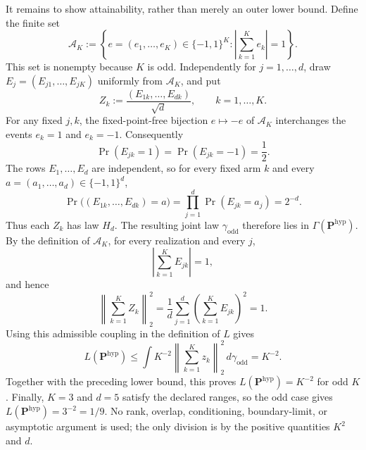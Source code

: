 It remains to show attainability, rather than merely an outer lower bound.  Define the finite set
\[
 \mathcal A_K
 :=\left\{e=(e_1,\ldots,e_K)\in\{-1,1\}^K:
 \left|\sum_{k=1}^K e_k\right|=1\right\}.
\]
This set is nonempty because \(K\) is odd.  Independently for \(j=1,\ldots,d\), draw \(E_j=(E_{j1},\ldots,E_{jK})\) uniformly from \(\mathcal A_K\), and put
\[
 Z_k:=\frac{(E_{1k},\ldots,E_{dk})}{\sqrt d},
 \qquad k=1,\ldots,K.
\]
For any fixed \(j,k\), the fixed-point-free bijection \(e\mapsto-e\) of \(\mathcal A_K\) interchanges the events \(e_k=1\) and \(e_k=-1\).  Consequently
\[
 \Pr(E_{jk}=1)=\Pr(E_{jk}=-1)=\frac12.
\]
The rows \(E_1,\ldots,E_d\) are independent, so for every fixed arm \(k\) and every \(a=(a_1,\ldots,a_d)\in\{-1,1\}^d\),
\[
 \Pr\bigl((E_{1k},\ldots,E_{dk})=a\bigr)
 =\prod_{j=1}^d\Pr(E_{jk}=a_j)=2^{-d}.
\]
Thus each \(Z_k\) has law \(H_d\).  The resulting joint law \(\gamma_{\mathrm{odd}}\) therefore lies in \(\Gamma(\mathbf P^{\mathrm{hyp}})\).  By the definition of \(\mathcal A_K\), for every realization and every \(j\),
\[
 \left|\sum_{k=1}^K E_{jk}\right|=1,
\]
and hence
\[
 \left\|\sum_{k=1}^K Z_k\right\|_2^2
 =\frac1d\sum_{j=1}^d
 \left(\sum_{k=1}^K E_{jk}\right)^2
 =1.
\]
Using this admissible coupling in the definition of \(L\) gives
\[
 L(\mathbf P^{\mathrm{hyp}})
 \le \int K^{-2}\left\|\sum_{k=1}^Kz_k\right\|_2^2
 \,d\gamma_{\mathrm{odd}}
 =K^{-2}.
\]
Together with the preceding lower bound, this proves \(L(\mathbf P^{\mathrm{hyp}})=K^{-2}\) for odd \(K\).  Finally, \(K=3\) and \(d=5\) satisfy the declared ranges, so the odd case gives \(L(\mathbf P^{\mathrm{hyp}})=3^{-2}=1/9\).  No rank, overlap, conditioning, boundary-limit, or asymptotic argument is used; the only division is by the positive quantities \(K^2\) and \(d\).

